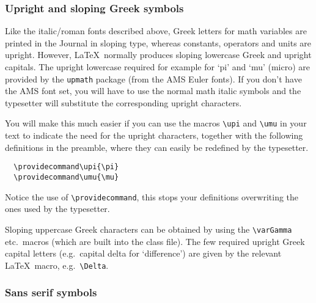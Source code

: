 \documentclass{jfm}
\providecommand\upi{\pi}%
\providecommand\upi{\pi}%
\newcommand\etc{etc.\ }
\newcommand\eg{e.g.\ }
\begin{document}
\subsubsection{Upright and sloping Greek symbols}

Like the italic/roman fonts described above, Greek letters for math
variables are printed in the Journal in sloping type, whereas constants,
operators and units are upright. However, \LaTeX\ normally produces sloping
lowercase Greek and upright capitals. The upright lowercase required for
example for `pi' and `mu' (micro) are provided by the \verb"upmath" package
(from the AMS Euler fonts). If you don't have the AMS font set, you will have
to use the normal math italic symbols and the typesetter will substitute the
corresponding upright characters.

You will make this much easier if you can use the macros \verb"\upi" and
\verb"\umu" in your text to indicate the need for the upright characters,
together with the following definitions in the preamble, where they can
easily be redefined by the typesetter.
%
\begin{verbatim}
  \providecommand\upi{\pi}
  \providecommand\umu{\mu}
\end{verbatim}
%
Notice the use of \verb"\providecommand", this stops your
definitions overwriting the ones used by the typesetter.

Sloping uppercase Greek characters can be obtained by using the
\verb"\varGamma" \etc macros (which are built into the class file).
The few required upright Greek capital letters (\eg capital delta for
`difference') are given by the relevant \LaTeX\ macro, \eg \verb"\Delta".

\subsubsection{Sans serif symbols}
\end{document}
